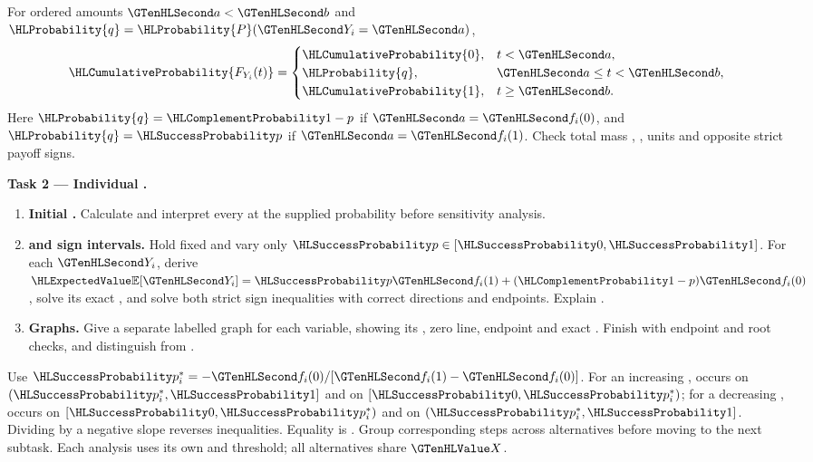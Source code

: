 For ordered amounts $\Money{a}<\Money{b}$ and $\HLProbability{q}=\HLProbability{P}(\Money{Y_i}=\Money{a})$,
\[
\HLCumulativeProbability{F_{Y_i}(t)}=\begin{cases}\HLCumulativeProbability{0},&t<\Money{a},\\\HLProbability{q},&\Money{a}\leq t<\Money{b},\\\HLCumulativeProbability{1},&t\geq\Money{b}.\end{cases}
\]
Here $\HLProbability{q}=\FailureProb{1-p}$ if $\Money{a}=\Money{f_i(0)}$, and $\HLProbability{q}=\SuccessProb{p}$ if $\Money{a}=\Money{f_i(1)}$.
Check total mass , , units and opposite strict payoff signs.

\CThreeModelIntroOne
\clearpage
\textbf{Task 2 --- Individual .}
\begin{enumerate}
\item \textbf{Initial .} Calculate and interpret every  at the supplied probability before sensitivity analysis.
\item \textbf{ and sign intervals.} Hold  fixed and vary only $\SuccessProb{p}\in\left[\SuccessProb{0},\SuccessProb{1}\right]$. For each $\Money{Y_i}$, derive $\ExpectedValue{\mathbb E}[\Money{Y_i}]=\SuccessProb{p} \Money{f_i(1)}+(\FailureProb{1-p})\Money{f_i(0)}$, solve its exact , and solve both strict sign inequalities with correct directions and endpoints. Explain .
\item \textbf{Graphs.} Give a separate labelled graph for each variable, showing its , zero line, endpoint  and exact . Finish with endpoint and root checks, and distinguish  from .
\end{enumerate}
Use $\SuccessProb{p_i^*}=-\Money{f_i(0)}/[\Money{f_i(1)}-\Money{f_i(0)}]$. For an increasing ,
 occurs on $\left(\SuccessProb{p_i^*},\SuccessProb{1}\right]$ and  on $\left[\SuccessProb{0},\SuccessProb{p_i^*}\right)$; for a decreasing ,
 occurs on $\left[\SuccessProb{0},\SuccessProb{p_i^*}\right)$ and  on $\left(\SuccessProb{p_i^*},\SuccessProb{1}\right]$. Dividing by a negative slope reverses inequalities.
Equality is . Group corresponding steps across alternatives before moving to the next subtask.
Each analysis uses its own  and threshold; all alternatives share $\Indicator{X}$.

